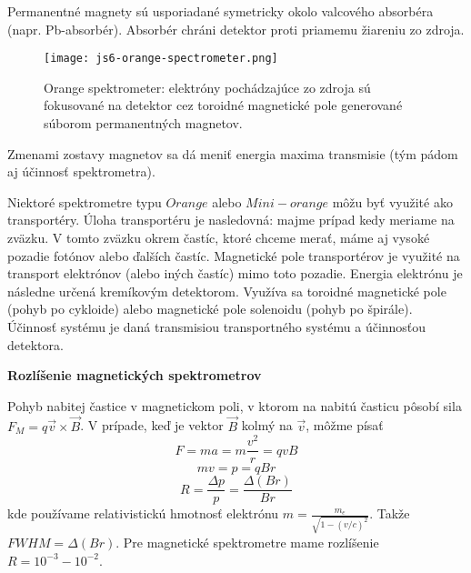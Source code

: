 \documentclass[../../main.tex]{subfiles}
\begin{document}
\begin{itemize}
	Permanentné magnety sú usporiadané symetricky okolo valcového absorbéra (napr. Pb-absorbér). Absorbér chráni detektor proti priamemu žiareniu zo zdroja.
	\begin{figure}[!h]
	\centering
	\texttt{[image: js6-orange-spectrometer.png]}
	\caption{Orange spektrometer: elektróny pochádzajúce zo zdroja sú fokusované na detektor cez toroidné magnetické pole generované súborom permanentných magnetov.}
	\label{js6:fig:orange_spektrometer}
	\end{figure}
	Zmenami zostavy magnetov sa dá meniť energia maxima transmisie (tým pádom aj účinnosť spektrometra).\par
	Niektoré spektrometre typu $Orange$ alebo $Mini-orange$ môžu byť využité ako transportéry. Úloha transportéru je nasledovná: majme prípad kedy meriame na zväzku. V tomto zväzku okrem častíc, ktoré chceme merať, máme aj vysoké pozadie fotónov alebo ďalších častíc. Magnetické pole transportérov je využité na transport elektrónov (alebo iných častíc) mimo toto pozadie. Energia elektrónu je následne určená kremíkovým detektorom. Využíva sa toroidné magnetické pole (pohyb po cykloide) alebo magnetické pole solenoidu (pohyb po špirále). Účinnosť systému je daná transmisiou transportného systému a účinnosťou detektora.
\end{itemize}
\textbf{Rozlíšenie magnetických spektrometrov}\par
Pohyb nabitej častice v magnetickom poli, v ktorom na nabitú časticu pôsobí sila $F_{M}=q\vec{v}\times \vec{B}$. V prípade, keď je vektor $\vec{B}$ kolmý na $\vec{v}$, môžme písať
$$ F=ma=m\frac{v^2}{r}=qvB $$ 
$$ mv=p=qBr $$
$$ R=\frac{\Delta p}{p}=\frac{\Delta(Br)}{Br} $$
kde používame relativistickú hmotnosť elektrónu $m=\frac{m_e}{\sqrt{1-(v/c)^2}}$. Takže $FWHM=\Delta(Br)$. Pre magnetické spektrometre mame rozlíšenie $R=10^{-3}-10^{-2}$.
\end{document}
